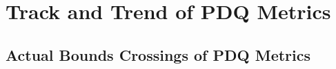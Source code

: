% 
% 
% 
%
%

\section{Track and Trend of PDQ Metrics}

\subsection{Actual Bounds Crossings of PDQ Metrics}

